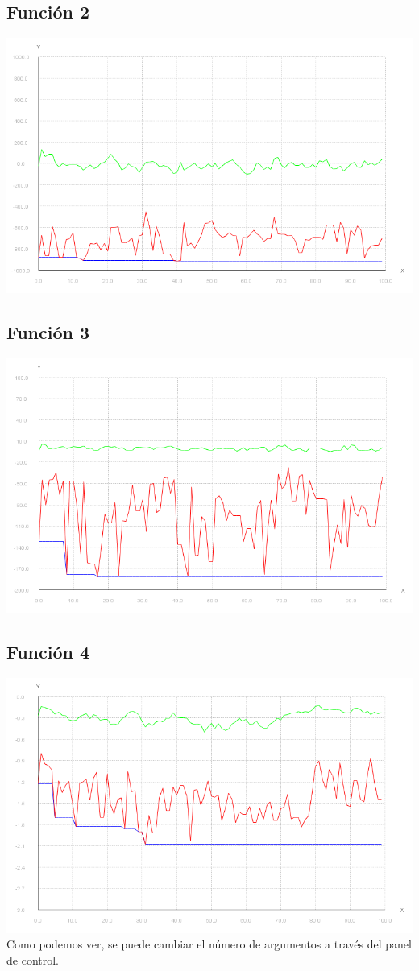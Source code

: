 \documentclass{article}
\begin{document}
\subsection{Función 2}
\includegraphics[scale=0.5]{./images/graph2_bin.png}

\subsection{Función 3}
\includegraphics[scale=0.5]{./images/graph3_bin.png}

\subsection{Función 4}
\includegraphics[scale=0.5]{./images/graph4_bin.png}
Como podemos ver, se puede cambiar el número de argumentos a través del panel de control.
\end{document}

